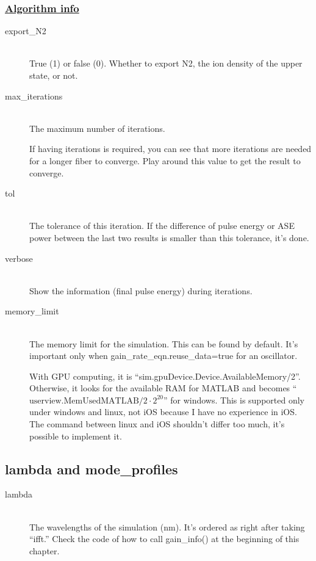 \documentclass[12pt,hidelinks]{book}
\begin{document}
\subsubsection{\underline{Algorithm info}}
\begin{description}
\item[\color{blue}export\_N2]\mbox{}\\
True (1) or false (0). Whether to export N2, the ion density of the upper state, or not.

\item[\color{blue}max\_iterations]\mbox{}\\
The maximum number of iterations.

If having iterations is required, you can see that more iterations are needed for a longer fiber to converge. Play around this value to get the result to converge.

\item[\color{blue}tol]\mbox{}\\
The tolerance of this iteration. If the difference of pulse energy or ASE power between the last two results is smaller than this tolerance, it's done.

\item[\color{blue}verbose]\mbox{}\\
Show the information (final pulse energy) during iterations.

\item[memory\_limit]\mbox{}\\
The memory limit for the simulation. This can be found by default. It's important only when gain\_rate\_eqn.reuse\_data=true for an oscillator.

With GPU computing, it is ``sim.gpuDevice.Device.AvailableMemory/2''. Otherwise, it looks for the available RAM for MATLAB and becomes ``$\text{userview.MemUsedMATLAB}/2\cdot 2^{20}$'' for windows. This is supported only under windows and linux, not iOS because I have no experience in iOS. The command between linux and iOS shouldn't differ too much, it's possible to implement it.
\end{description}

\subsection{lambda and mode\_profiles}
\begin{description}
\item[\color{blue}lambda]\mbox{}\\
The wavelengths of the simulation (\si{\nm}). It's ordered as right after taking ``ifft.'' Check the code of how to call gain\_info() at the beginning of this chapter.
\end{description}
\end{document}
